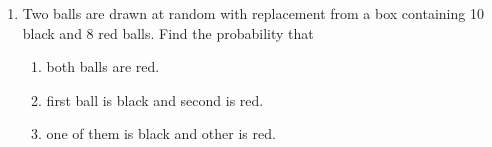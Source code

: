 \renewcommand{\theequation}{\theenumi}
\begin{enumerate}[label=\thesection.\arabic*.,ref=\thesection.\theenumi]
\item Two balls are drawn at random with
replacement from a box containing 10
black and 8 red balls. Find the probability that 
\begin{enumerate}
\item both balls are red.
\item first ball is black and second is red.
\item one of them is black and other is red.
\end{enumerate}
\end{enumerate}
